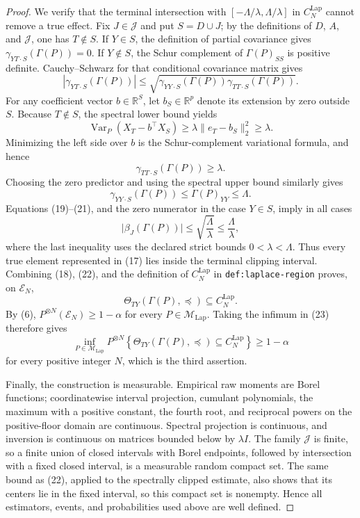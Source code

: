 \documentclass{article}
\begin{document}
\begin{proof}
We verify that the terminal intersection with
\([-\Lambda/\lambda,\Lambda/\lambda]\) in
\(C_N^{\mathrm{Lap}}\) cannot remove a true effect.  Fix
\(J\in\mathcal J\) and put \(S=D\cup J\); by the definitions of \(D\),
\(A\), and \(\mathcal J\), one has \(T\notin S\).  If \(Y\in S\), the
definition of partial covariance gives
\(\gamma_{YT\mathbin{\cdot}S}(\Gamma(P))=0\).  If \(Y\notin S\), the
Schur complement of \(\Gamma(P)_{SS}\) is positive definite.  Cauchy--Schwarz
for that conditional covariance matrix gives
\[
 \left\lvert\gamma_{YT\mathbin{\cdot}S}(\Gamma(P))\right\rvert
 \leq
 \sqrt{
 \gamma_{YY\mathbin{\cdot}S}(\Gamma(P))
 \gamma_{TT\mathbin{\cdot}S}(\Gamma(P))}.
                                                               \tag{19}
\]
For any coefficient vector \(b\in\mathbb R^S\), let \(b_S\in\mathbb R^p\)
denote its extension by zero outside \(S\).  Because \(T\notin S\), the
spectral lower bound yields
\[
 \operatorname{Var}_P\!\left(X_T-b^\top X_S\right)
 \geq\lambda\lVert e_T-b_S\rVert_2^2
 \geq\lambda.
\]
Minimizing the left side over \(b\) is the Schur-complement variational
formula, and hence
\[
 \gamma_{TT\mathbin{\cdot}S}(\Gamma(P))\geq\lambda.     \tag{20}
\]
Choosing the zero predictor and using the spectral upper bound similarly
gives
\[
 \gamma_{YY\mathbin{\cdot}S}(\Gamma(P))
 \leq\Gamma(P)_{YY}\leq\Lambda.                         \tag{21}
\]
Equations (19)--(21), and the zero numerator in the case \(Y\in S\), imply
in all cases
\[
 \lvert\beta_J(\Gamma(P))\rvert
 \leq\sqrt{\frac{\Lambda}{\lambda}}
 \leq\frac{\Lambda}{\lambda},                          \tag{22}
\]
where the last inequality uses the declared strict bounds
\(0<\lambda<\Lambda\).  Thus every true element represented in (17) lies
inside the terminal clipping interval.  Combining (18), (22), and the
definition of \(C_N^{\mathrm{Lap}}\) in
\texttt{def:laplace-region} proves, on \(\mathcal E_N\),
\[
 \Theta_{TY}(\Gamma(P),\preceq)\subseteq C_N^{\mathrm{Lap}}. \tag{23}
\]
By (6), \(P^{\otimes N}(\mathcal E_N)\geq1-\alpha\) for every
\(P\in\mathcal M_{\mathrm{Lap}}\).  Taking the infimum in (23) therefore
gives
\[
 \inf_{P\in\mathcal M_{\mathrm{Lap}}}
 P^{\otimes N}\!\left\{
 \Theta_{TY}(\Gamma(P),\preceq)\subseteq C_N^{\mathrm{Lap}}
 \right\}\geq1-\alpha                                  \tag{24}
\]
for every positive integer \(N\), which is the third assertion.

Finally, the construction is measurable.  Empirical raw moments are Borel
functions; coordinatewise interval projection, cumulant polynomials, the
maximum with a positive constant, the fourth root, and reciprocal powers on
the positive-floor domain are continuous.  Spectral projection is
continuous, and inversion is continuous on matrices bounded below by
\(\lambda I\).  The family \(\mathcal J\) is finite, so a finite union of
closed intervals with Borel endpoints, followed by intersection with a
fixed closed interval, is a measurable random compact set.  The same bound
as (22), applied to the spectrally clipped estimate, also shows that its
centers lie in the fixed interval, so this compact set is nonempty.  Hence
all estimators, events, and probabilities used above are well defined.
\end{proof}
\end{document}
